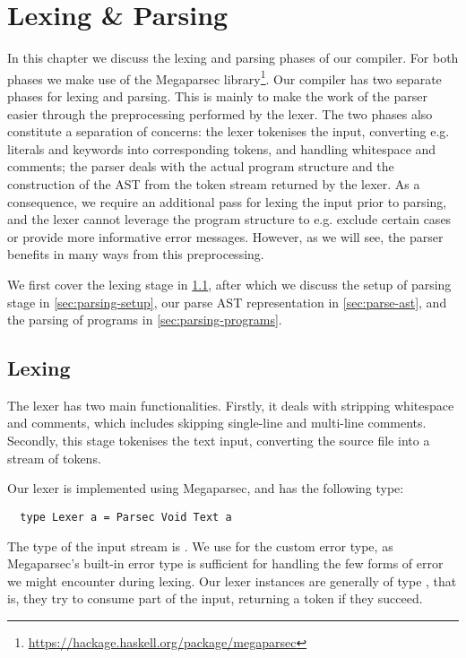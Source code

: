 \chapter{Lexing \& Parsing} \label{chp:lexing-parsing}

In this chapter we discuss the lexing and parsing phases of our compiler.
For both phases we make use of the Megaparsec
library\footnote{\url{https://hackage.haskell.org/package/megaparsec}}.
%
Our compiler has two separate phases for lexing and parsing.
This is mainly to make the work of the parser easier through the preprocessing
performed by the lexer.
The two phases also constitute a separation of concerns: the lexer
tokenises the input, converting e.g. literals and keywords into corresponding
tokens, and handling whitespace and comments; the parser deals with the actual
program structure and the construction of the AST from the token stream returned
by the lexer.
%
As a consequence, we require an additional pass for lexing the input prior to
parsing, and the lexer cannot leverage the program structure to e.g. exclude
certain cases or provide more informative error messages.
However, as we will see, the parser benefits in many ways from this
preprocessing.

We first cover the lexing stage in \cref{sec:lexing}, after which we discuss
the setup of parsing stage in \cref{sec:parsing-setup}, our parse AST
representation in \cref{sec:parse-ast}, and the parsing of programs in
\cref{sec:parsing-programs}.


\section{Lexing} \label{sec:lexing}

The lexer has two main functionalities.
Firstly, it deals with stripping whitespace and comments, which includes
skipping single-line and multi-line comments.
Secondly, this stage tokenises the text input, converting the source file into a
stream of tokens.

Our lexer is implemented using Megaparsec, and has the following type:
\begin{verbatim}
  type Lexer a = Parsec Void Text a
\end{verbatim}
%
The type of the input stream is . We use  for the
custom error type, as Megaparsec's built-in error type is sufficient for
handling the few forms of error we might encounter during lexing.
%
Our lexer instances are generally of type , that is, they
try to consume part of the input, returning a token if they succeed.

